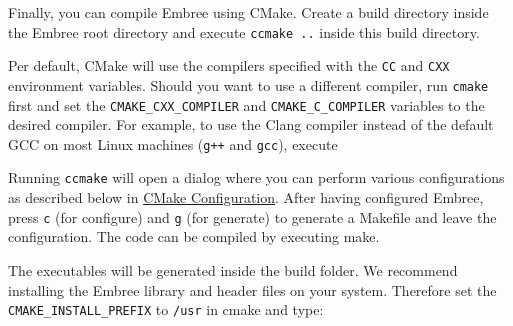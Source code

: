 Finally, you can compile Embree using CMake. Create a build directory
inside the Embree root directory and execute \texttt{ccmake\ ..} inside
this build directory.

\begin{Shaded}
\begin{Highlighting}[]
\end{Highlighting}
\end{Shaded}

Per default, CMake will use the compilers specified with the \texttt{CC}
and \texttt{CXX} environment variables. Should you want to use a
different compiler, run \texttt{cmake} first and set the
\texttt{CMAKE\_CXX\_COMPILER} and \texttt{CMAKE\_C\_COMPILER} variables
to the desired compiler. For example, to use the Clang compiler instead
of the default GCC on most Linux machines (\texttt{g++} and
\texttt{gcc}), execute

\begin{Shaded}
\begin{Highlighting}[]
\OperatorTok{{-}}\OperatorTok{=}\OperatorTok{++} \OperatorTok{{-}}\OperatorTok{=}
\end{Highlighting}
\end{Shaded}

Running \texttt{ccmake} will open a dialog where you can perform various
configurations as described below in
\hyperref[cmake-configuration]{CMake Configuration}. After having
configured Embree, press \texttt{c} (for configure) and \texttt{g} (for
generate) to generate a Makefile and leave the configuration. The code
can be compiled by executing make.

\begin{Shaded}
\begin{Highlighting}[]
\OperatorTok{{-}}
\end{Highlighting}
\end{Shaded}

The executables will be generated inside the build folder. We recommend
installing the Embree library and header files on your system. Therefore
set the \texttt{CMAKE\_INSTALL\_PREFIX} to \texttt{/usr} in cmake and
type:

\begin{Shaded}
\begin{Highlighting}[]
\end{Highlighting}
\end{Shaded}

